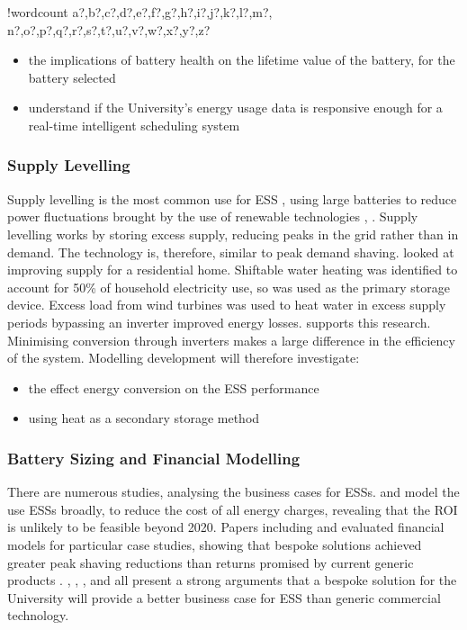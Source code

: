 \documentclass[fontsize=9.5pt]{extarticle}
\numberwithin{figure}{section} %
\providecommand{\tightlist}{%
  \setlength{\itemsep}{0pt}\setlength{\parskip}{0pt}}
\newcounter{words}
\newenvironment{counted}{%
  \setcounter{words}{0}
  \SearchList!{wordcount}{\stepcounter{words}}
    {a?,b?,c?,d?,e?,f?,g?,h?,i?,j?,k?,l?,m?,
    n?,o?,p?,q?,r?,s?,t?,u?,v?,w?,x?,y?,z?}
  \UndoBoundary{'}
  \SearchOrder{p;}}{%
  \StopSearching}
\begin{document}
\begin{counted}
\begin{itemize}
\tightlist
\item
  the implications of battery health on the lifetime value of the
  battery, for the battery selected
\item
  understand if the University's energy usage data is responsive enough
  for a real-time intelligent scheduling system
\end{itemize}

\subsubsection{Supply Levelling}\label{supply-levelling}

Supply levelling is the most common use for ESS \cite{iearoadmapes},
using large batteries to reduce power fluctuations brought by the use of
renewable technologies \cite{7324861}, \cite{7564619}. Supply levelling
works by storing excess supply, reducing peaks in the grid rather than
in demand. The technology is, therefore, similar to peak demand shaving.
\cite{Allik20161116} looked at improving supply for a residential home.
Shiftable water heating was identified to account for 50\% of household
electricity use, so was used as the primary storage device. Excess load
from wind turbines was used to heat water in excess supply periods
bypassing an inverter improved energy losses. \cite{Leadbetter2012685}
supports this research. Minimising conversion through inverters makes a
large difference in the efficiency of the system. Modelling development
will therefore investigate:

\begin{itemize}
\tightlist
\item
  the effect energy conversion on the ESS performance
\item
  using heat as a secondary storage method
\end{itemize}

\subsubsection{Battery Sizing and Financial
Modelling}\label{battery-sizing-and-financial-modelling}

There are numerous studies, analysing the business cases for ESSs.
\cite{7555795} and \cite{7555793} model the use ESSs broadly, to reduce
the cost of all energy charges, revealing that the ROI is unlikely to be
feasible beyond 2020. Papers including \cite{1300158} and \cite{6175723}
evaluated financial models for particular case studies, showing that
bespoke solutions achieved greater peak shaving reductions than returns
promised by current generic products \cite{abbpeakshave}.
\cite{7555795}, \cite{7555793}, \cite{1300158}, \cite{6175723} and
\cite{20164002874437} all present a strong arguments that a bespoke
solution for the University will provide a better business case for ESS
than generic commercial technology.


\end{counted}
\end{document}
